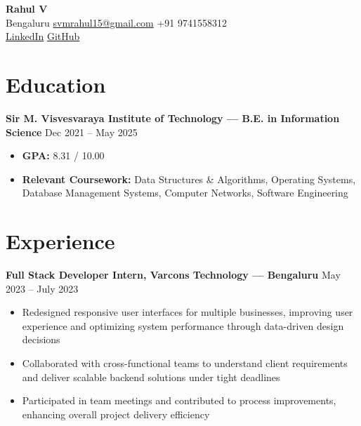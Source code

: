 \documentclass[10pt, letterpaper]{article}
\newenvironment{highlights}{
    \begin{itemize}[
        topsep=0.1cm,
        parsep=0.1cm,
        itemsep=3pt,
        leftmargin=10pt
    ]
}{
    \end{itemize}
}
\newenvironment{twocolentry}[2][]{
    \noindent\textbf{#2} \hfill {\small #1}\par
}{}
\begin{document}
\begin{center}
    \fontsize{20pt}{20pt}\selectfont \textbf{Rahul V}\\
    \vspace{5pt}
    \normalsize Bengaluru \textperiodcentered{} \href{mailto:svmrahul15@gmail.com}{svmrahul15@gmail.com} \textperiodcentered{} +91 9741558312\\
    \href{https://www.linkedin.com/in/rahulv1510}{\faLinkedin{} LinkedIn} \textperiodcentered{} \href{https://github.com/captainRedCodes}{\faGithub{} GitHub}
\end{center}
\vspace{5pt}


\section{Education}
\begin{twocolentry}[Dec 2021 -- May 2025]{Sir M. Visvesvaraya Institute of Technology — B.E. in Information Science}
\end{twocolentry}
\begin{highlights}
    \item \textbf{GPA:} 8.31 / 10.00
    \item \textbf{Relevant Coursework:} Data Structures \& Algorithms, Operating Systems, Database Management Systems, Computer Networks, Software Engineering
\end{highlights}

\section{Experience}
\begin{twocolentry}[May 2023 -- July 2023]{Full Stack Developer Intern, Varcons Technology — Bengaluru}
\end{twocolentry}
\begin{highlights}
    \item Redesigned responsive user interfaces for multiple businesses, improving user experience and optimizing system performance through data-driven design decisions
    \item Collaborated with cross-functional teams to understand client requirements and deliver scalable backend solutions under tight deadlines
    \item Participated in team meetings and contributed to process improvements, enhancing overall project delivery efficiency
\end{highlights}
\end{document}
